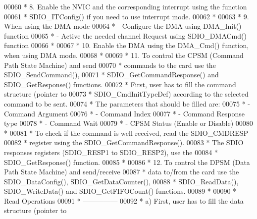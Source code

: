 \begin{DoxyCode}
00060 \textcolor{comment}{  *          8. Enable the NVIC and the corresponding interrupt using the function }
00061 \textcolor{comment}{  *             SDIO\_ITConfig() if you need to use interrupt mode. }
00062 \textcolor{comment}{  *}
00063 \textcolor{comment}{  *          9. When using the DMA mode }
00064 \textcolor{comment}{  *                   - Configure the DMA using DMA\_Init() function}
00065 \textcolor{comment}{  *                   - Active the needed channel Request using SDIO\_DMACmd() function}
00066 \textcolor{comment}{  *}
00067 \textcolor{comment}{  *          10. Enable the DMA using the DMA\_Cmd() function, when using DMA mode. }
00068 \textcolor{comment}{  *}
00069 \textcolor{comment}{  *          11. To control the CPSM (Command Path State Machine) and send }
00070 \textcolor{comment}{  *              commands to the card use the SDIO\_SendCommand(), }
00071 \textcolor{comment}{  *              SDIO\_GetCommandResponse() and SDIO\_GetResponse() functions.     }
00072 \textcolor{comment}{  *              First, user has to fill the command structure (pointer to}
00073 \textcolor{comment}{  *              SDIO\_CmdInitTypeDef) according to the selected command to be sent.}
00074 \textcolor{comment}{  *                 The parameters that should be filled are:}
00075 \textcolor{comment}{  *                   - Command Argument}
00076 \textcolor{comment}{  *                   - Command Index}
00077 \textcolor{comment}{  *                   - Command Response type}
00078 \textcolor{comment}{  *                   - Command Wait}
00079 \textcolor{comment}{  *                   - CPSM Status (Enable or Disable)}
00080 \textcolor{comment}{  *}
00081 \textcolor{comment}{  *              To check if the command is well received, read the SDIO\_CMDRESP}
00082 \textcolor{comment}{  *              register using the SDIO\_GetCommandResponse().}
00083 \textcolor{comment}{  *              The SDIO responses registers (SDIO\_RESP1 to SDIO\_RESP2), use the}
00084 \textcolor{comment}{  *              SDIO\_GetResponse() function.}
00085 \textcolor{comment}{  *}
00086 \textcolor{comment}{  *          12. To control the DPSM (Data Path State Machine) and send/receive }
00087 \textcolor{comment}{  *              data to/from the card use the SDIO\_DataConfig(), SDIO\_GetDataCounter(), }
00088 \textcolor{comment}{  *              SDIO\_ReadData(), SDIO\_WriteData() and SDIO\_GetFIFOCount() functions.}
00089 \textcolor{comment}{  *}
00090 \textcolor{comment}{  *              Read Operations}
00091 \textcolor{comment}{  *              ---------------}
00092 \textcolor{comment}{  *              a) First, user has to fill the data structure (pointer to}

\end{DoxyCode}
